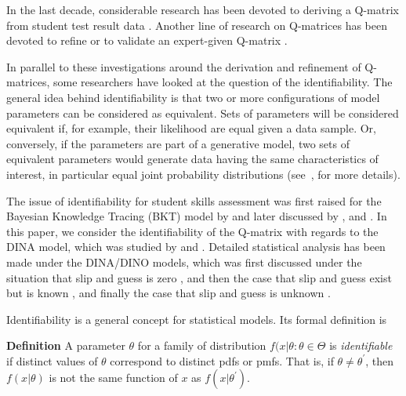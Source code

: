 \documentclass{edm_template}
\begin{document}
In the last decade, considerable research has been devoted to deriving a Q-matrix from student test result data \cite{barnes2010novel, liu2012data, desmarais2015combining, xu2016boosted}.  Another line of research on Q-matrices has been devoted to refine or to validate an expert-given Q-matrix \cite{de2015general, chiu2013statistical, desmarais2013matrix}.

In parallel to these investigations around the derivation and refinement of Q-matrices, some researchers have looked at the question of the identifiability.  The general idea behind identifiability is that two or more configurations of model parameters can be considered as equivalent.  Sets of parameters will be considered equivalent if, for example, their likelihood are equal given a data sample.  Or, conversely, if the parameters are part of a generative model, two sets of equivalent parameters would generate data having the same characteristics of interest, in particular equal joint probability distributions (see~, for more details).

The issue of identifiability for student skills assessment was first raised for the Bayesian Knowledge Tracing (BKT) model by  and later discussed by , and .  In this paper, we consider the identifiability of the Q-matrix with regards to the DINA model, which was studied by  and .  Detailed statistical analysis has been made under the DINA/DINO models, which was first discussed under the situation that slip and guess is zero \cite{chiu2009cluster}, and then the case that slip and guess exist but is known \cite{liu2013theory}, and finally the case that slip and guess is unknown \cite{chen2015statistical}. 


Identifiability is a general concept for statistical models. Its formal definition is

\textbf{Definition} \cite{casella2002statistical} A parameter $\theta$ for a family of distribution ${f(x|\theta: \theta \in \Theta}$ is \textit{identifiable} if distinct values of $\theta$ correspond to distinct pdfs or pmfs. That is, if $\theta \neq \theta^{\prime}$, then $f(x|\theta)$ is not the same function of $x$ as $f(x|\theta^{\prime})$.
\end{document}
